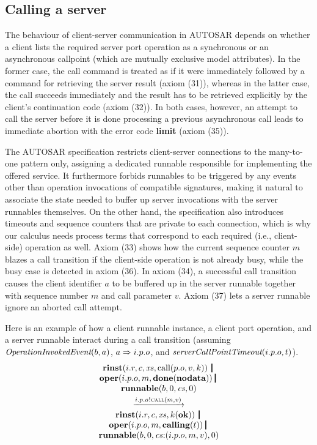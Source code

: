 \documentclass[twocolumn]{article}
\begin{document}
\subsection{Calling a server} \label{sect:Call}

The behaviour of client-server communication in AUTOSAR depends on whether a client lists the required server port operation as a synchronous or an asynchronous callpoint (which are mutually exclusive model attributes). In the former case, the call command is treated as if it were immediately followed by a command for retrieving the server result (axiom (31)), whereas in the latter case, the call succeeds immediately and the result has to be retrieved explicitly by the client's continuation code (axiom (32)). In both cases, however, an attempt to call the server before it is done processing a previous asynchronous call leads to immediate abortion with the error code \textbf{limit} (axiom (35)).

The AUTOSAR specification restricts client-server connections to the many-to-one pattern only, assigning a dedicated runnable responsible for implementing the offered service. It furthermore forbids runnables to be triggered by any events other than operation invocations of compatible signatures, making it natural to associate the state needed to buffer up server invocations with the server runnables themselves. On the other hand, the specification also introduces timeouts and sequence counters that are private to each connection, which is why our calculus needs process terms that correspond to each required (i.e., client-side) operation as well. Axiom (33) shows how the current sequence counter $m$ blazes a call transition if the client-side operation is not already busy, while the busy case is detected in axiom (36). In axiom (34), a successful call transition causes the client identifier $a$ to be buffered up in the server runnable together with sequence number $m$ and call parameter $v$. Axiom (37) lets a server runnable ignore an aborted call attempt.

Here is an example of how a client runnable instance, a client port operation, and a server runnable interact during a call transition (assuming $\emph{OperationInvokedEvent}(b,a)$, $a \Rightarrow i.p.o$, and $\emph{serverCallPointTimeout}(i.p.o,t) $).
$$
\begin{array}{c}
  {\Trinst {i.r} c \Xs {\TrteCall {p.o} v k}} \,\Opar  \\
  {\Toper {i.p.o} m {\Tdone \Tnodata}} \Opar \\
  {\Trunnable b 0 \Cs 0} \vspace{0.6ex} \\
  \red{\say{i.p.o}{\Tcall m v}} \\
  {\Trinst {i.r} c \Xs {\Tap k \Tok}} \,\Opar \\
  {\Toper {i.p.o} m {\Tcalling t}} \Opar \\
  {\Trunnable b 0 {\Tcons \Cs {\Tclient {i.p.o} m v}}  0}
\end{array}
$$
\end{document}
